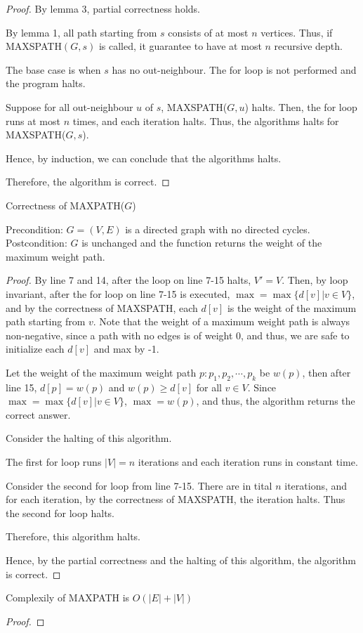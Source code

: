 \documentclass[10pt]{article}
\begin{document}
\begin{proof}
	By lemma 3, partial correctness holds.

	By lemma 1, all path starting from $s$ consists of at most $n$ vertices. 
	Thus, if MAXSPATH$(G, s)$ is called, it guarantee to have at most $n$
	recursive depth. 

	The base case is when $s$ has no out-neighbour.
	The for loop is not performed and the program halts.

	Suppose for all out-neighbour $u$ of $s$, MAXSPATH($G,u$) halts.
	Then, the for loop runs at most $n$ times, and each iteration halts. 
	Thus, the algorithms halts for MAXSPATH($G,s$).

	Hence, by induction, we can conclude that the algorithms halts.

	Therefore, the algorithm is correct.
\end{proof}

Correctness of MAXPATH($G$)

Precondition: $G=(V,E)$ is a directed graph with no directed cycles. \\
Postcondition: $G$ is unchanged and the function returns the weight of the
maximum weight path.

\begin{proof}
	By line 7 and 14, after the loop on line 7-15 halts, $V' = V$.
	Then, by loop invariant, after the for loop on line 7-15 is executed, $\max
	= \max\{d[v] | v \in V\}$, and by the correctness of MAXSPATH, each
	$d[v]$ is the weight of the maximum path starting from $v$. 
	Note that the weight of a maximum weight path is always non-negative, since
	a path with no edges is of weight 0, and thus, we are safe to initialize
	each $d[v]$ and max by -1. 

	Let the weight of the maximum weight path $p: p_1, p_2, \cdots, p_k$ be
	$w(p)$, then after line 15, $d[p] = w(p)$ and $w(p) \geq d[v]$ for all $v
	\in V$. 
	Since $\max = \max\{d[v] | v \in V\}$, $\max = w(p)$, and thus, the
	algorithm returns the correct answer. 

	Consider the halting of this algorithm.

	The first for loop runs $|V| = n$ iterations and each iteration runs in
	constant time.
	
	Consider the second for loop from line 7-15. 
	There are in tital $n$ iterations, and for each iteration, by the
	correctness of MAXSPATH, the iteration halts.
	Thus the second for loop halts. 

	Therefore, this algorithm halts. 

	Hence, by the partial correctness and the halting of this algorithm, the
	algorithm is correct.
\end{proof}

Complexily of MAXPATH is $O(|E|+|V|)$
\begin{proof}
	
\end{proof}
\end{document}
